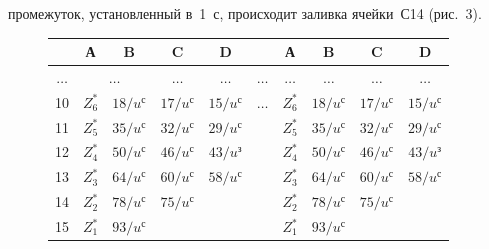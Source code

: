 промежуток, уста\-нов\-лен\-ный в~1~с, происходит заливка ячейки~С14 (рис.~3).


  


  \begin{figure} %


  {\small \begin{center}


  \begin{tabular}{|c|c|c|c|c|c|c|c|c|c|}


  \hline


\cellcolor[gray]{.9}&\cellcolor[gray]{.9}А&\cellcolor[gray]{.9}B&\cellcolor[gray]{.9}C&


\cellcolor[gray]{.9}D&&\cellcolor[gray]{.9}А&\cellcolor[gray]{.9}B&\cellcolor[gray]{.9}C&\cellcolor[gray]{.9}D\\


\hline


\cellcolor[gray]{.9}$\ldots$&\multicolumn{2}{c|}{$\ldots$}&$\ldots$&$\ldots$&$\ldots$&$\ldots$&$\ldots$&$\ldots$&$\ldots$\\


\cellcolor[gray]{.9}10&$Z^*_6$&$18/u^{\mathrm{с}}$&$17/u^{\mathrm{с}}$&$15/u^{\mathrm{с}}$&


$\ldots$&$Z^*_6$&$18/u^{\mathrm{с}}$&$17/u^{\mathrm{с}}$&$15/u^{\mathrm{с}}$\\


\cellcolor[gray]{.9}11&$Z^*_5$&$35/u^{\mathrm{с}}$&$32/u^{\mathrm{с}}$&$29/u^{\mathrm{с}}


$&&$Z_5^*$&$35/u^{\mathrm{с}}$&$32/u^{\mathrm{с}}$&$29/u^{\mathrm{с}}$\\


\cellcolor[gray]{.9}12&$Z_4^*$&$50/u^{\mathrm{с}}$&$46/u^{\mathrm{с}}$&$43/u^{\mathrm{з}}$


&&$Z^*_4$&$50/u^{\mathrm{с}}$&$46/u^{\mathrm{с}}$&$43/u^{\mathrm{з}}$\\


\cellcolor[gray]{.9}13&$Z_3^*$&$64/u^{\mathrm{с}}$&$60/u^{\mathrm{с}}$&$58/u^{\mathrm{с}}


$&&$Z^*_3$&$64/u^{\mathrm{с}}$&$60/u^{\mathrm{с}}$&$58/u^{\mathrm{с}}$\\


\cellcolor[gray]{.9}14&$Z_2^*$&$78/u^{\mathrm{с}}$&$75/u^{\mathrm{с}}$& &&$Z_2^*$&$78/u^{\mathrm{с}}$&\cellcolor[gray]{.9}$75/u^{\mathrm{с}}$& \\


\cellcolor[gray]{.9}15&$Z_1^*$&\cellcolor[gray]{.9}$93/u^{\mathrm{с}}$& & &&$Z_1^*$&\cellcolor[gray]{.9}$93/u^{\mathrm{с}}$& & \\



\end{tabular}
\end{center}}
\end{figure}
